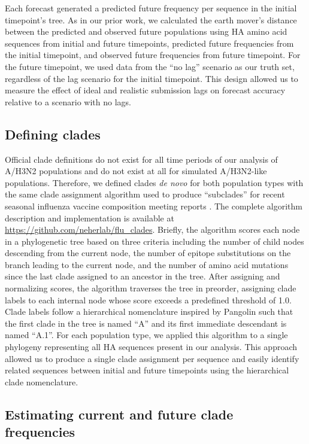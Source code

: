 \documentclass[9pt,lineno]{elife}
\begin{document}
Each forecast generated a predicted future frequency per sequence in the initial timepoint's tree.
As in our prior work, we calculated the earth mover's distance \citep{Rubner1998} between the predicted and observed future populations using HA amino acid sequences from initial and future timepoints, predicted future frequencies from the initial timepoint, and observed future frequencies from future timepoint.
For the future timepoint, we used data from the ``no lag'' scenario as our truth set, regardless of the lag scenario for the initial timepoint.
This design allowed us to measure the effect of ideal and realistic submission lags on forecast accuracy relative to a scenario with no lags.

\subsection{Defining clades}

Official clade definitions do not exist for all time periods of our analysis of A/H3N2 populations and do not exist at all for simulated A/H3N2-like populations.
Therefore, we defined clades \emph{de novo} for both population types with the same clade assignment algorithm used to produce ``subclades'' for recent seasonal influenza vaccine composition meeting reports \citep{Huddleston2024}.
The complete algorithm description and implementation is available at \url{https://github.com/neherlab/flu_clades}.
Briefly, the algorithm scores each node in a phylogenetic tree based on three criteria including the number of child nodes descending from the current node, the number of epitope substitutions on the branch leading to the current node, and the number of amino acid mutations since the last clade assigned to an ancestor in the tree.
After assigning and normalizing scores, the algorithm traverses the tree in preorder, assigning clade labels to each internal node whose score exceeds a predefined threshold of 1.0.
Clade labels follow a hierarchical nomenclature inspired by Pangolin \citep{OToole2021} such that the first clade in the tree is named ``A'' and its first immediate descendant is named ``A.1''.
For each population type, we applied this algorithm to a single phylogeny representing all HA sequences present in our analysis.
This approach allowed us to produce a single clade assignment per sequence and easily identify related sequences between initial and future timepoints using the hierarchical clade nomenclature.

\subsection{Estimating current and future clade frequencies}
\end{document}
